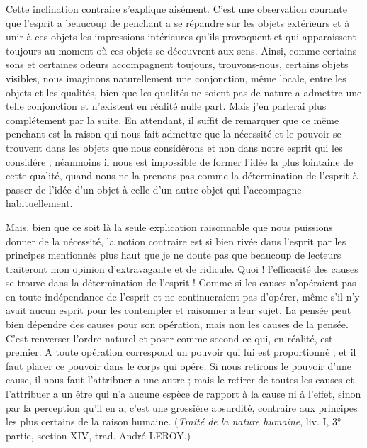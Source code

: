 Cette inclination contraire s’explique aisément. C’est
une observation courante que l'esprit a beaucoup de
penchant a se répandre sur les objets extérieurs et à unir
à ces objets les impressions intérieures qu’ils provoquent
et qui apparaissent toujours au moment où ces objets se
découvrent aux sens. Ainsi, comme certains sons et certaines
odeurs accompagnent toujours, trouvons-nous, certains
objets visibles, nous imaginons naturellement une
conjonction, même locale, entre les objets et les qualités,
bien que les qualités ne soient pas de nature a admettre
une telle conjonction et n’existent en réalité nulle part.
Mais j’en parlerai plus complétement par la suite. En
attendant, il suffit de remarquer que ce même penchant
est la raison qui nous fait admettre que la nécessité et le
pouvoir se trouvent dans les objets que nous considérons
et non dans notre esprit qui les considére ; néanmoins il
nous est impossible de former l'idée la plus lointaine de
cette qualité, quand nous ne la prenons pas comme la
détermination de l’esprit à passer de l'idée d’un objet à
celle d’un autre objet qui l’accompagne habituellement.

Mais, bien que ce soit là la seule explication raisonnable
que nous puissions donner de la nécessité, la notion contraire
est si bien rivée dans l’esprit par les principes mentionnés
plus haut que je ne doute pas que beaucoup de lecteurs
traiteront mon opinion d’extravagante et de ridicule.
Quoi ! l’efficacité des causes se trouve dans la détermination
de l'esprit ! Comme si les causes n’opéraient pas en toute
indépendance de l’esprit et ne continueraient pas d’opérer,
même s’il n’y avait aucun esprit pour les contempler et
raisonner a leur sujet. La pensée peut bien dépendre des
causes pour son opération, mais non les causes de la pensée.
C’est renverser l’ordre naturel et poser comme second ce
qui, en réalité, est premier. A toute opération correspond
un pouvoir qui lui est proportionné ; et il faut placer ce
pouvoir dans le corps qui opére. Si nous retirons le pouvoir
d’une cause, il nous faut l’attribuer a une autre ; mais le
retirer de toutes les causes et l’attribuer a un être qui n’a
aucune espèce de rapport à la cause ni à l’effet, sinon par
la perception qu’il en a, c’est une grossiére absurdité,
contraire aux principes les plus certains de la raison
humaine. ({\it Traité de la nature humaine}, liv. I, 3° partie,
section XIV, trad. André L{\footnotesize EROY}.)

